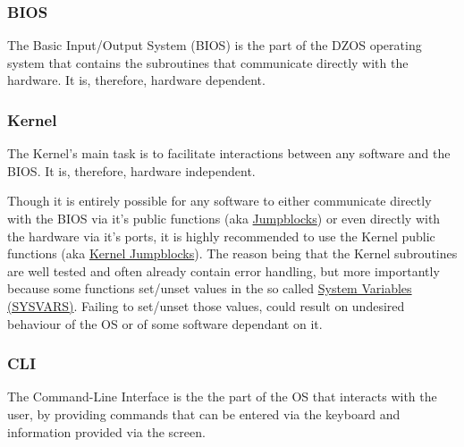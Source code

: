         \subsubsection{BIOS}

        The Basic Input/Output System (BIOS) is the part of the DZOS operating
        system that contains the subroutines that communicate directly with the
        hardware. It is, therefore, hardware dependent.

        \subsubsection{Kernel}

        The Kernel's main task is to facilitate interactions between any
        software and the BIOS. It is, therefore, hardware independent.

        Though it is entirely possible for any software to either communicate
        directly with the BIOS via it's public functions (aka
        \hyperref[sec:biosjumpblocks]{Jumpblocks}) or even directly with the
        hardware via it's ports, it is highly recommended to use the Kernel
        public functions (aka \hyperref[sec:kerneljumpblocks]{Kernel
        Jumpblocks}). The reason being that the Kernel subroutines are well
        tested and often already contain error handling, but more importantly
        because some functions set/unset values in the so called
        \hyperref[sec:ram_memmap]{System Variables (SYSVARS)}. Failing to
        set/unset those values, could result on undesired behaviour of the OS
        or of some software dependant on it.

        \subsubsection{CLI}

        The Command-Line Interface is the the part of the OS that interacts with
        the user, by providing commands that can be entered via the keyboard and
        information provided via the screen.

